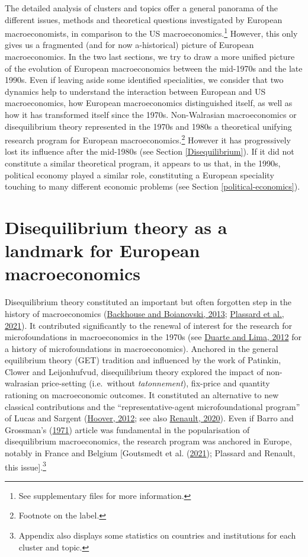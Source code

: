 \documentclass[]{elsarticle} %
\begin{document}
The detailed analysis of clusters and topics offer a general panorama of
the different issues, methods and theoretical questions investigated by
European macroeconomists, in comparison to the US
macroeconomics.\footnote{See supplementary files for more information.}
However, this only gives us a fragmented (and for now a-historical)
picture of European macroeconomics. In the two last sections, we try to
draw a more unified picture of the evolution of European macroeconomics
between the mid-1970s and the late 1990s. Even if leaving aside some
identified specialities, we consider that two dynamics help to
understand the interaction between European and US macroeconomics, how
European macroeconomics distinguished itself, as well as how it has
transformed itself since the 1970s. Non-Walrasian macroeconomics or
disequilibrium theory represented in the 1970s and 1980s a theoretical
unifying research program for European macroeconomics.\footnote{Footnote
  on the label.} However it has progressively lost its influence after
the mid-1980s (see Section \ref{Disequilibrium}). If it did not
constitute a similar theoretical program, it appears to us that, in the
1990s, political economy played a similar role, constituting a European
speciality touching to many different economic problems (see Section
\ref{political-economics}).

\hypertarget{disequilibrium}{%
\section{Disequilibrium theory as a landmark for European
macroeconomics}\label{disequilibrium}}

Disequilibrium theory constituted an important but often forgotten step
in the history of macroeconomics
(\protect\hyperlink{ref-backhouseboianovski2013}{Backhouse and
Boianovski, 2013}; \protect\hyperlink{ref-plassard2021}{Plassard et al.,
2021}). It contributed significantly to the renewal of interest for the
research for microfoundations in macroeconomics in the 1970s (see
\protect\hyperlink{ref-duartelima2012a}{Duarte and Lima, 2012} for a
history of microfoundations in macroeconomics). Anchored in the general
equilibrium theory (GET) tradition and influenced by the work of
Patinkin, Clower and Leijonhufvud, disequilibrium theory explored the
impact of non-walrasian price-setting (i.e.~without \emph{tatonnement}),
fix-price and quantity rationing on macroeconomic outcomes. It
constituted an alternative to new classical contributions and the
``representative-agent microfoundational program'' of Lucas and Sargent
(\protect\hyperlink{ref-hoover2012}{Hoover, 2012}; see also
\protect\hyperlink{ref-renault2020a}{Renault, 2020}). Even if Barro and
Grossman's (\protect\hyperlink{ref-barro1971}{1971}) article was
fundamental in the popularisation of disequilibrium macroeconomics, the
research program was anchored in Europe, notably in France and Belgium
{[}Goutsmedt et al. (\protect\hyperlink{ref-goutsmedt2021}{2021});
Plassard and Renault, this issue{]}.\footnote{Appendix also displays
  some statistics on countries and institutions for each cluster and
  topic.}
\end{document}
